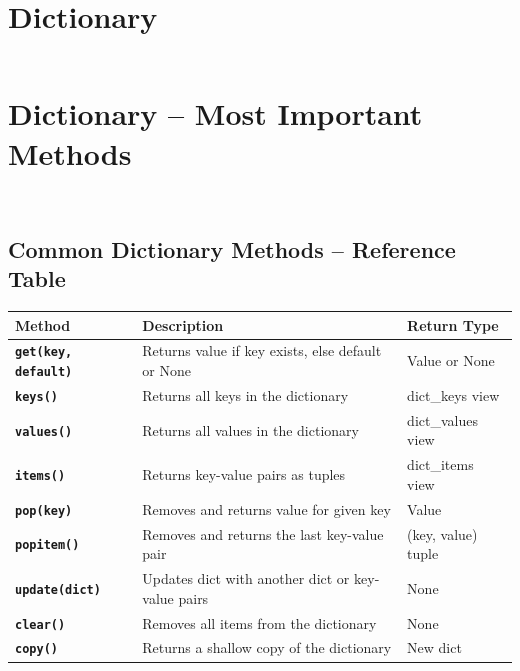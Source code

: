 \documentclass[a4paper,11pt]{article}
\begin{document}
	\newpage

\section{Dictionary}
\inputminted{python}{Python_Files/dict_basics_guid.py}

	\newpage
	
\section{Dictionary – Most Important Methods}
\inputminted{python}{Python_Files/dict_methods_guid.py}

\inputminted{python}{Python_Files/dict_key_value_item_get_examples.py}

\vspace{1em}
\subsection*{Common Dictionary Methods – Reference Table}

\renewcommand{\arraystretch}{1.6}
\begin{tabular}{>{\bfseries}p{4cm} p{6.5cm} p{2.8cm}}
	\toprule
	Method & Description & Return Type \\
	\midrule
	
	\texttt{get(key, default)} & Returns value if key exists, else default or None & Value or None \\
	\texttt{keys()} & Returns all keys in the dictionary & dict\_keys view \\
	\texttt{values()} & Returns all values in the dictionary & dict\_values view \\
	\texttt{items()} & Returns key-value pairs as tuples & dict\_items view \\
	\texttt{pop(key)} & Removes and returns value for given key & Value \\
	\texttt{popitem()} & Removes and returns the last key-value pair & (key, value) tuple \\
	\texttt{update(dict)} & Updates dict with another dict or key-value pairs & None \\
	\texttt{clear()} & Removes all items from the dictionary & None \\
	\texttt{copy()} & Returns a shallow copy of the dictionary & New dict \\
	
	\bottomrule
\end{tabular}
\end{document}
